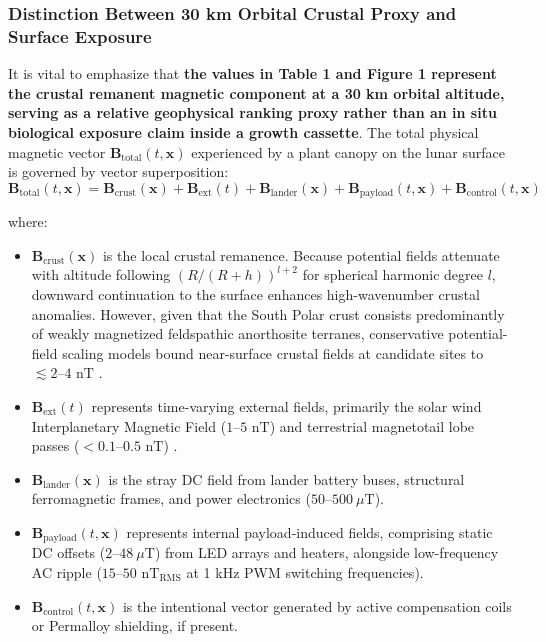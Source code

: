 \documentclass[default,sn-nature,iicol]{sn-jnl}
\begin{document}
\subsubsection{Distinction Between 30 km Orbital Crustal Proxy and Surface Exposure}
It is vital to emphasize that \textbf{the values in Table 1 and Figure 1 represent the crustal remanent magnetic component at a 30 km orbital altitude, serving as a relative geophysical ranking proxy rather than an in situ biological exposure claim inside a growth cassette}. The total physical magnetic vector $\mathbf{B}_{\text{total}}(t, \mathbf{x})$ experienced by a plant canopy on the lunar surface is governed by vector superposition:
\begin{equation}
\mathbf{B}_{\text{total}}(t, \mathbf{x}) = \mathbf{B}_{\text{crust}}(\mathbf{x}) + \mathbf{B}_{\text{ext}}(t) + \mathbf{B}_{\text{lander}}(\mathbf{x}) + \mathbf{B}_{\text{payload}}(t, \mathbf{x}) + \mathbf{B}_{\text{control}}(t, \mathbf{x})
\end{equation}

where:
\begin{itemize}
\item $\mathbf{B}_{\text{crust}}(\mathbf{x})$ is the local crustal remanence. Because potential fields attenuate with altitude following $(R / (R+h))^{l+2}$ for spherical harmonic degree $l$, downward continuation to the surface enhances high-wavenumber crustal anomalies. However, given that the South Polar crust consists predominantly of weakly magnetized feldspathic anorthosite terranes, conservative potential-field scaling models bound near-surface crustal fields at candidate sites to $\lesssim 2\text{--}4\text{ nT}$ \cite{ref18}.
\item $\mathbf{B}_{\text{ext}}(t)$ represents time-varying external fields, primarily the solar wind Interplanetary Magnetic Field ($1\text{--}5\text{ nT}$) and terrestrial magnetotail lobe passes ($<0.1\text{--}0.5\text{ nT}$) \cite{ref14,ref15}.
\item $\mathbf{B}_{\text{lander}}(\mathbf{x})$ is the stray DC field from lander battery buses, structural ferromagnetic frames, and power electronics ($50\text{--}500\ \mu\text{T}$).
\item $\mathbf{B}_{\text{payload}}(t, \mathbf{x})$ represents internal payload-induced fields, comprising static DC offsets ($2\text{--}48\ \mu\text{T}$) from LED arrays and heaters, alongside low-frequency AC ripple ($15\text{--}50\text{ nT}_{\text{RMS}}$ at 1 kHz PWM switching frequencies).
\item $\mathbf{B}_{\text{control}}(t, \mathbf{x})$ is the intentional vector generated by active compensation coils or Permalloy shielding, if present.
\end{itemize}
\end{document}
